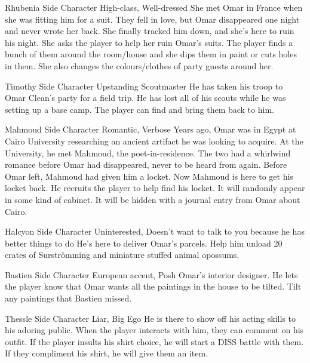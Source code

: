 {Rhubenia}
{Side Character}
{High-class, Well-dressed}
{She met Omar in France when she was fitting him for a suit. They fell in love, but Omar disappeared one night and never wrote her back. She finally tracked him down, and she's here to ruin his night.}
{She asks the player to help her ruin Omar's suits. The player finds a bunch of them around the room/house and she dips them in paint or cuts holes in them. She also changes the colours/clothes of party guests around her.}

{Timothy}
{Side Character}
{Upstanding Scoutmaster}
{He has taken his troop to Omar Clean's party for a field trip.}
{He has lost all of his scouts while he was setting up a base camp. The player can find and bring them back to him.}

{Mahmoud}
{Side Character}
{Romantic, Verbose}
{Years ago, Omar was in Egypt at Cairo University researching an ancient artifact he was looking to acquire. At the University, he met Mahmoud, the poet-in-residence. The two had a whirlwind romance before Omar had disappeared, never to be heard from again. Before Omar left, Mahmoud had given him a locket. Now Mahmoud is here to get his locket back.}
{He recruits the player to help find his locket. It will randomly appear in some kind of cabinet. It will be hidden with a journal entry from Omar about Cairo.}

{Halcyon}
{Side Character}
{Uninterested, Doesn't want to talk to you because he has better things to do}
{He's here to deliver Omar's parcels.}
{Help him unload 20 crates of Surstr\"{o}mming and miniature stuffed animal opossums.}

{Bastien}
{Side Character}
{European accent, Posh}
{Omar's interior designer.}
{He lets the player know that Omar wants all the paintings in the house to be tilted. Tilt any paintings that Bastien missed.}

{Thessle}
{Side Character}
{Liar, Big Ego}
{He is there to show off his acting skills to his adoring public.}
{When the player interacts with him, they can comment on his outfit. If the player insults his shirt choice, he will start a DISS battle with them. If they compliment his shirt, he will give them an item.}